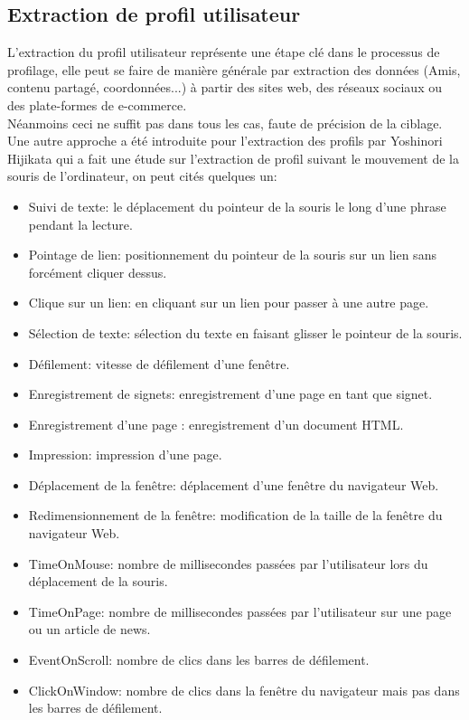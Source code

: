 \subsection{Extraction de profil utilisateur}
L'extraction du profil utilisateur représente une étape clé dans le processus de profilage, elle peut se faire de manière générale par extraction des données (Amis, contenu partagé, coordonnées...) à partir des sites web, des réseaux sociaux ou des plate-formes de e-commerce.\\ 
Néanmoins ceci ne suffit pas dans tous les cas, faute de précision de la ciblage. Une autre approche a été introduite pour l'extraction des profils par Yoshinori Hijikata qui a fait une étude sur l'extraction de profil suivant le mouvement de la souris de l'ordinateur, on peut cités quelques un:
\begin{itemize}
    \item Suivi de texte: le déplacement du pointeur de la souris le long d'une phrase pendant la lecture.
    \item Pointage de lien: positionnement du pointeur de la souris sur un lien sans forcément cliquer dessus.
    \item Clique sur un lien: en cliquant sur un lien pour passer à une autre page.
    \item Sélection de texte: sélection du texte en faisant glisser le pointeur de la souris.
    \item Défilement: vitesse de défilement d'une fenêtre.
    \item Enregistrement de signets: enregistrement d'une page en tant que signet.
    \item Enregistrement d'une page : enregistrement d'un document HTML.
    \item Impression: impression d'une page.
    \item Déplacement de la fenêtre: déplacement d'une fenêtre du navigateur Web.
    \item Redimensionnement de la fenêtre: modification de la taille de la fenêtre du navigateur Web.
    \item TimeOnMouse: nombre de millisecondes passées par l'utilisateur lors du déplacement de la souris.
    \item TimeOnPage: nombre de millisecondes passées par l'utilisateur sur une page ou un article de news.
    \item EventOnScroll: nombre de clics dans les barres de défilement.
    \item ClickOnWindow: nombre de clics dans la fenêtre du navigateur mais pas dans les barres de défilement.

\end{itemize}
